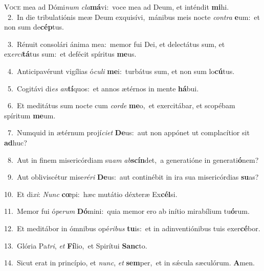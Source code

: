 \lettrine{\initial\textcolor{\initialcolor}{V}}{oce} mea ad Dómi\textit{num} \textit{cla}\-\textbf{má}vi:~\star voce mea ad Deum, et inténdit \textbf{mi}\-hi.\\
{\numbfont\textcolor{\numbcolor}{~2.}}~In die tribulatiónis meæ Deum exquisívi,~\dagger mánibus meis nocte \textit{con}\-\textit{tra} \textbf{e}\-um:~\star et non sum de\-\textbf{cép}\-tus.\par
{\numbfont\textcolor{\numbcolor}{~3.}}~Rénuit consolári ánima mea:~\dagger memor fui Dei, et delectátus sum, et ex\-\textit{er}\-\textit{ci}\textbf{tá}tus sum:~\star et defécit spíritus \textbf{me}\-us.\par
{\numbfont\textcolor{\numbcolor}{~4.}}~Anticipavérunt vigílias ó\-\textit{cu}\-\textit{li} \textbf{me}\-i:~\star turbátus sum, et non sum lo\-\textbf{cú}\-tus.\par
{\numbfont\textcolor{\numbcolor}{~5.}}~Cogitávi di\textit{es} \textit{an}\-\textbf{tí}quos:~\star et annos ætérnos in mente \textbf{há}\-bui.\par
{\numbfont\textcolor{\numbcolor}{~6.}}~Et meditátus sum nocte cum \textit{cor}\-\textit{de} \textbf{me}\-o,~\star et exercitábar, et scopébam spíritum \textbf{me}\-um.\par
{\numbfont\textcolor{\numbcolor}{~7.}}~Numquid in ætérnum projí\-\textit{ci}\-\textit{et} \textbf{De}\-us:~\star aut non appónet ut complacítior sit \textbf{ad}\-huc?\par
{\numbfont\textcolor{\numbcolor}{~8.}}~Aut in finem misericórdiam su\textit{am} \textit{ab}\-\textbf{scín}det,~\star a generatióne in generati\-\textbf{ó}\-nem?\par
{\numbfont\textcolor{\numbcolor}{~9.}}~Aut obliviscétur mise\-\textit{ré}\-\textit{ri} \textbf{De}\-us:~\star aut continébit in ira sua misericórdias \textbf{su}\-as?\par
{\numbfont\textcolor{\numbcolor}{10.}}~Et di\-\textit{xi}\-: \textit{Nunc} \textbf{cœ}\-pi:~\star hæc mutátio déxteræ Ex\-\textbf{cél}\-si.\par
{\numbfont\textcolor{\numbcolor}{11.}}~Memor fui ó\-\textit{pe}\-\textit{rum} \textbf{Dó}\-mini:~\star quia memor ero ab inítio mirabílium tu\-\textbf{ó}\-rum.\par
{\numbfont\textcolor{\numbcolor}{12.}}~Et meditábor in ómnibus opé\-\textit{ri}\-\textit{bus} \textbf{tu}\-is:~\star et in adinventiónibus tuis exer\-\textbf{cé}\-bor.\par
{\numbfont\textcolor{\numbcolor}{13.}}~Glória Pa\-\textit{tri}\-, \textit{et} \textbf{Fí}\-lio,~\star et Spirítui \textbf{Sanc}\-to.\par
{\numbfont\textcolor{\numbcolor}{14.}}~Sicut erat in princípio, et \textit{nunc}\-, \textit{et} \textbf{sem}\-per,~\star et in sǽcula sæculórum. \textbf{A}\-men.\par
